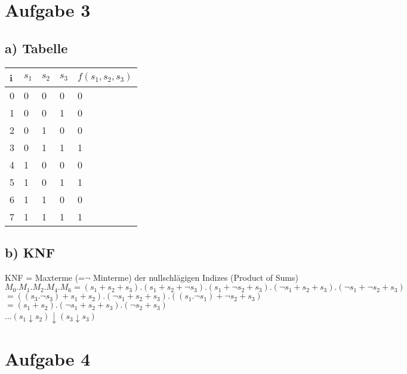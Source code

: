 \section{Aufgabe 3}
\subsection{a) Tabelle}
\begin{tabular}{|l||l|l|l||l|}\hline
i & $s_1$ & $s_2$ & $s_3$ & $f(s_1,s_2,s_3)$ \\\hline\hline
0 & 0 & 0 & 0 & 0 \\\hline
1 & 0 & 0 & 1 & 0 \\\hline
2 & 0 & 1 & 0 & 0 \\\hline
3 & 0 & 1 & 1 & 1 \\\hline
4 & 1 & 0 & 0 & 0 \\\hline
5 & 1 & 0 & 1 & 1 \\\hline
6 & 1 & 1 & 0 & 0 \\\hline
7 & 1 & 1 & 1 & 1 \\\hline
\end{tabular}

\subsection{b) KNF}
KNF = Maxterme (=$\neg$ Minterme) der nullschlägigen Indizes (Product of Sums)\\
$M_0 . M_1 . M_2 . M_4 . M_6 = (s_1+s_2+s_3) . (s_1+s_2+\neg s_3) . (s_1+\neg s_2+s_3) . (\neg s_1+s_2+s_3) . (\neg s_1+\neg s_2+s_3)$\\
$= ((s_3.\neg s_3)+s_1+s_2) . (\neg s_1+s_2+s_3) . ((s_1.\neg s_1)+\neg s_2+s_3) $\\
$= (s_1+s_2) . (\neg s_1+s_2+s_3) . (\neg s_2+s_3)$\\
...$(s_1 \downarrow s_2) \downarrow (s_3 \downarrow s_3)$


\section{Aufgabe 4}

